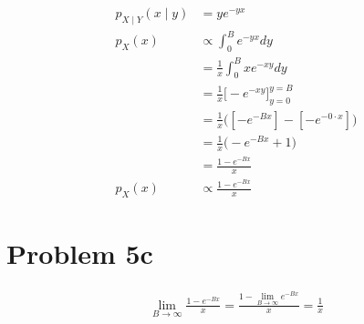 \documentclass[12pt, letterpaper]{article}
\begin{document}
\begin{align*}
p_{X \mid Y}(x \mid y) & = ye^{-yx}
\\
p_{X}(x) & \propto \int_{0}^B e^{-yx} dy 
\\[0.5ex]
& = \frac{1}{x} \int_{0}^B xe^{-xy} dy 
\\[0.5ex]
& = \frac{1}{x} \Big[ - e^{-xy}
\Big]_{y=0}^{y=B} 
\\[0.5ex]
& = \frac{1}{x} \Big(
\left[ -e^{-Bx} \right]  - \left[ -e^{-0 \cdot x} \right] 
\Big)
\\[0.5ex]
& = \frac{1}{x} \Big( - e^{-Bx} + 1 \Big) 
\\[0.5ex]
& = \frac{ 1 - e^{-Bx} }{x}
\\[1.5ex]
p_{X}(x) & \propto \frac{ 1 - e^{-Bx} }{x}
\end{align*}



\section*{Problem 5c} 
\begin{align*}
\lim_{B \to \infty} \frac{ 1 - e^{-Bx} }{x} = \frac{ 1 - \lim_{B \to \infty} e^{-Bx}}{x}  = \frac{1}{x} 
\end{align*}
 
\end{document}
